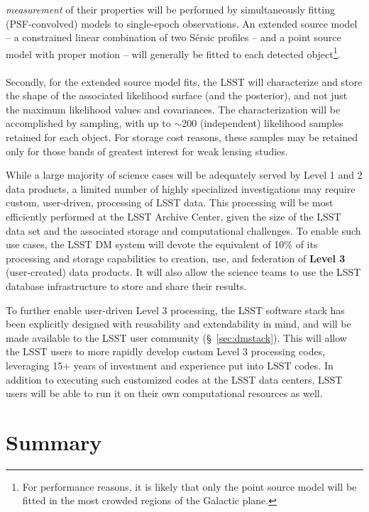 \documentclass[11pt,twoside]{article}
\begin{document}
\begin{itemize}
{\em measurement} of their properties will be performed by
simultaneously fitting (PSF-convolved) models to single-epoch
observations. An extended source model -- a constrained linear
combination of two S\'ersic profiles -- and a point source model with
proper motion -- will generally be
fitted to each detected object\footnote{For performance reasons, it is
  likely that only the point source model will be fitted in the most
  crowded regions of the Galactic plane.}.\\
\\
Secondly, for the extended source model fits, the LSST will
characterize and store the shape of the associated likelihood surface
(and the posterior), and not just the maximum likelihood values and
covariances. The characterization will be accomplished by sampling,
with up to $\sim$200 (independent) likelihood samples retained for
each object. For storage cost reasons, these samples
may be retained only for those bands of greatest interest for
weak lensing studies.

\end{itemize}


While a large majority of science cases will be adequately served by
Level 1 and 2 data products, a limited number of highly specialized
investigations may require custom, user-driven, processing of LSST
data. This processing will be most efficiently performed at the
LSST Archive Center, given the size of the LSST data set and the
associated storage and computational challenges. To enable such use
cases, the LSST DM system will devote the equivalent of 10\% of its
processing and storage capabilities to creation, use, and federation
of {\bf Level 3} (user-created) data products. It will also allow the
science teams to use the LSST database infrastructure to store and
share their results.

To further enable user-driven Level 3 processing, the LSST software
stack has been explicitly designed with reusability and
extendability in mind, and will be made available to the LSST user
community (\S~\ref{sec:dmstack}). This will allow the LSST users to
more rapidly develop custom Level 3 processing codes, leveraging 15+
years of investment and experience put into LSST codes. In addition to
executing such customized codes at the LSST data centers, LSST users
will be able to run it on their own computational resources as well.\\

\section{               Summary              }
\end{document}
